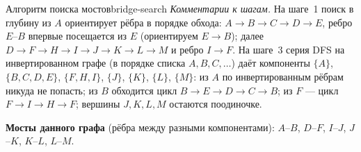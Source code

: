 \begin{algo}{Алгоритм поиска мостов}{bridge-search}
\noindent\textit{Комментарии к шагам.} На шаге~1 поиск в глубину из $A$
ориентирует рёбра в порядке обхода:
$A{\to}B{\to}C{\to}D{\to}E$, ребро $E$--$B$ впервые посещается из $E$
(ориентируем $E \to B$); далее $D{\to}F{\to}H{\to}I{\to}J{\to}K{\to}L{\to}M$
и ребро $I \to F$. На шаге~3 серия DFS на инвертированном графе
(в порядке списка $A, B, C, \dots$) даёт компоненты
$\{A\}$, $\{B, C, D, E\}$, $\{F, H, I\}$, $\{J\}$, $\{K\}$, $\{L\}$,
$\{M\}$: из $A$ по инвертированным рёбрам никуда не попасть; из $B$
обходится цикл $B{\to}E{\to}D{\to}C{\to}B$; из $F$ --- цикл
$F{\to}I{\to}H{\to}F$; вершины $J, K, L, M$ остаются поодиночке.

\medskip
\textbf{Мосты данного графа} (рёбра между разными компонентами):
$A$--$B$,\; $D$--$F$,\; $I$--$J$,\; $J$--$K$,\; $K$--$L$,\; $L$--$M$.
\end{algo}
